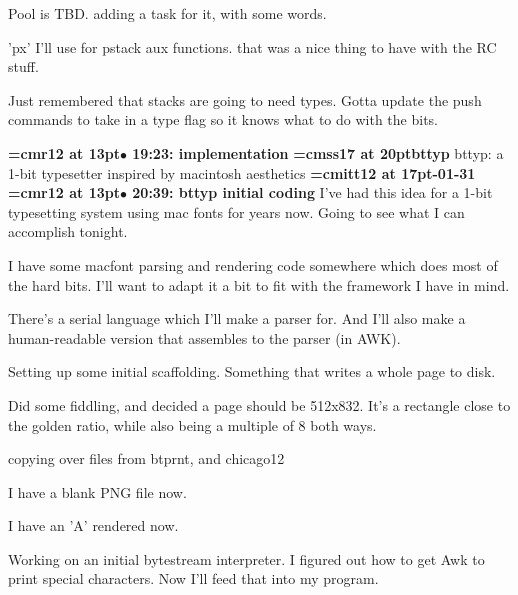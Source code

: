 Pool is TBD. adding a task for it, with some words.
\par

'px' I'll use for pstack aux functions. that was a nice thing to have with the RC stuff.
\par

Just remembered that stacks are going to need types. Gotta update the push commands to take in a type flag so it knows what to do with the bits.
\par

{\smallskip\noindent\bf\font\titlefont=cmr12 at 13pt\titlefont $\bullet$ 19:23: implementation}\smallskip
{}
{\medskip\noindent\bf\font\titlefont=cmss17 at 20pt\titlefont bttyp}\medskip
bttyp: a 1-bit typesetter inspired by macintosh aesthetics
{\medskip\noindent\bf\font\titlefont=cmitt12 at 17pt-01-31}\medskip
{\smallskip\noindent\bf\font\titlefont=cmr12 at 13pt\titlefont $\bullet$ 20:39: bttyp initial coding}\smallskip
I've had this idea for a 1-bit typesetting system using mac fonts for years now. Going to see what I can accomplish tonight.
\par

I have some macfont parsing and rendering code somewhere which does most of the hard bits. I'll want to adapt it a bit to fit with the framework I have in mind.
\par

There's a serial language which I'll make a parser for. And I'll also make a human-readable version that assembles to the parser (in AWK).
\par

Setting up some initial scaffolding. Something that writes a whole page to disk.
\par

Did some fiddling, and decided a page should be 512x832. It's a rectangle close to the golden ratio, while also being a multiple of 8 both ways.
\par

copying over files from btprnt, and chicago12
\par

I have a blank PNG file now.
\par

I have an 'A' rendered now.
\par

Working on an initial bytestream interpreter. I figured out how to get Awk to print special characters. Now I'll feed that into my program.
\par

